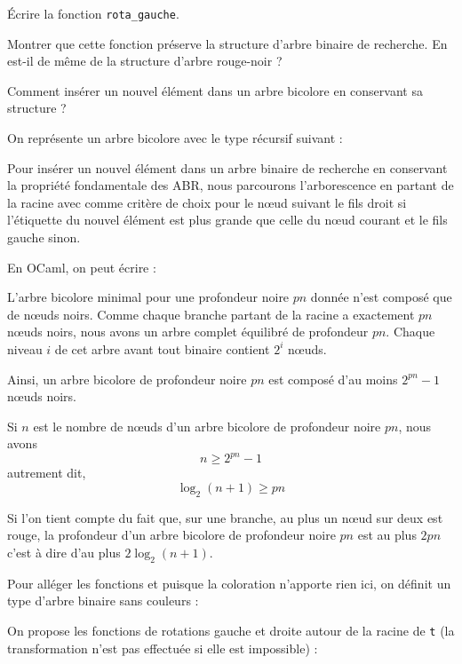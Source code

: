 Écrire la fonction \texttt{rota\_gauche}.
\smallskip

Montrer que cette fonction préserve la structure d'arbre binaire de recherche. En est-il de même de la structure d'arbre rouge-noir ?

\Q
Comment insérer un nouvel élément dans un arbre bicolore en conservant sa structure ?

\Corrige

\Q
On représente un arbre bicolore avec le type récursif suivant :



\Q
Pour insérer un nouvel élément dans un arbre binaire de recherche en conservant la propriété fondamentale des ABR, nous parcourons l'arborescence en partant de la racine avec comme critère de choix pour le nœud suivant le fils droit si l'étiquette du nouvel élément est plus grande que celle du nœud courant et le fils gauche sinon.
\medskip

En OCaml, on peut écrire :



\Q
L'arbre bicolore minimal pour une profondeur noire $pn$ donnée n'est composé que de nœuds noirs. Comme chaque branche partant de la racine a exactement $pn$ nœuds noirs, nous avons un arbre complet équilibré de profondeur $pn$. Chaque niveau $i$ de cet arbre avant tout binaire contient $2^i$ nœuds.
\medskip

Ainsi, un arbre bicolore de profondeur noire $pn$ est composé d'au moins $2^{pn}-1$ nœuds noirs.
\medskip

Si $n$ est le nombre de nœuds d'un arbre bicolore de profondeur noire $pn$, nous avons
\[
    n \geq 2^{pn}-1
\]
autrement dit,
\[
    \log_2(n+1) \geq pn
\]

Si l'on tient compte du fait que, sur une branche, au plus un nœud sur deux est rouge, la profondeur d'un arbre bicolore de profondeur noire $pn$ est au plus $2pn$ c'est à dire d'au plus $2\log_2(n+1)$.

\Q
Pour alléger les fonctions et puisque la coloration n'apporte rien ici, on définit un type d'arbre binaire sans couleurs :



On propose les fonctions de rotations gauche et droite autour de la racine de \texttt{t} (la transformation n'est pas effectuée si elle est impossible) :



